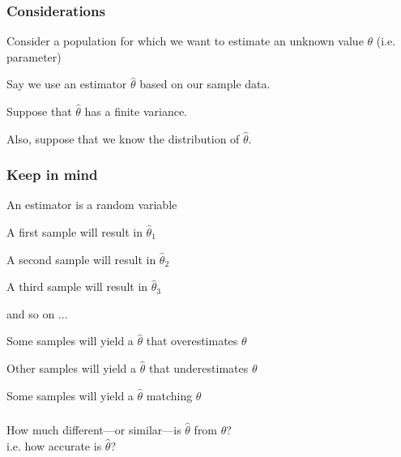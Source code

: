 \documentclass[12pt]{beamer}\usepackage[]{graphicx}\usepackage[]{color}
\begin{document}

\begin{frame}
\frametitle{Considerations}

\bbi
  \item Consider a population for which we want to estimate an unknown value $\theta$
  {\lolit (i.e. parameter)}
  \item Say we use an estimator $\hat{\theta}$ based on our sample data.
  \item Suppose that $\hat{\theta}$ has a finite variance.
  \item Also, suppose that we know the distribution of $\hat{\theta}$.
\ei

\end{frame}


\begin{frame}
\frametitle{Keep in mind}

\bi
  \item An estimator is a random variable
  \item A first sample will result in $\hat{\theta}_1$
  \item A second sample will result in $\hat{\theta}_2$
  \item A third sample will result in $\hat{\theta}_3$
  \item and so on ...
  \item Some samples will yield a $\hat{\theta}$ that overestimates $\theta$
  \item Other samples will yield a $\hat{\theta}$ that underestimates $\theta$
  \item Some samples will yield a $\hat{\theta}$ matching $\theta$
\ei

\end{frame}


\begin{frame}
\frametitle{}
\begin{center}

How much different---or similar---is $\hat{\theta}$ from $\theta$? \\
{\lolit i.e. how accurate is $\hat{\theta}$?}
\end{center}
\end{frame}

\end{document}
